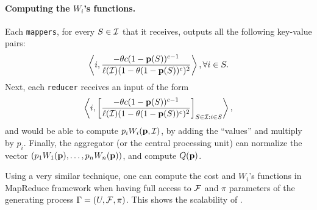 \paragraph{\bf Computing  the $W_i$'s functions.}
Each \texttt{mappers}, for every $S\in \S$ that it receives, outputs all the following key-value pairs:
$$\left\langle i,  \frac{-\theta c (1-\p(S))^{c-1}}{\ell(\S)(1-\theta(1-\p(S))^c)^2} \right\rangle, \forall i \in S.$$
Next, each \texttt{reducer} receives an input of the form
$$\left\langle i,  \left[\frac{-\theta c (1-\p(S))^{c-1}}{\ell(\S)(1-\theta(1-\p(S))^c)^2}\right]_{S\in \S: i\in S} \right\rangle,$$
and would be able to compute $p_iW_i(\p, \S)$, by adding the ``values'' and multiply by $p_i$.
Finally, the aggregator (or the central processing unit) can normalize the vector $(p_1W_1(\p), \ldots, p_nW_n(\p))$, and compute $Q(\p)$.

Using a very similar technique, one can compute the cost and $W_i$'s functions in MapReduce framework when having full access to $\F$ and $\pi$ parameters of the generating process $\sys=(U,\F,\pi)$. This shows the scalability of {\optimizer}.









